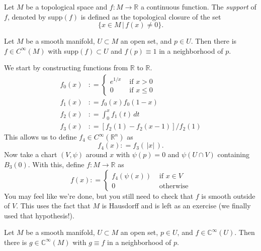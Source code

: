 \documentclass{ximera}
\begin{document}
    \begin{definition}[Support]
        Let $M$ be a topological space and $f : M \to \mathbb{R}$ a continuous function. The \emph{support} of $f$, denoted by supp$(f)$ is defined as the topological closure of the set 
        \[      \{  x \in M  \, \vert \, f(x) \neq 0  \} .   \]
    \end{definition}
    
    \begin{proposition}
        Let $M$ be a smooth manifold, $U \subset M$ an open set, and $p\in U$. Then there is $f \in C^{\infty}(M)$  with supp$(f) \subset U$ and $f(p) \equiv 1$ in a neighborhood of $p$. 

        

    
    \begin{solution}
         We start by constructing functions from $\mathbb{R}$ to $\mathbb{R}$. 
    \begin{align*}
              f_0(x)    & : = \begin{cases}
            e^{1/x}  & \text{ if } x > 0 \\
            0 & \text{ if } x \leq 0
        \end{cases}           \\
     f_1 (x) &: = f_0 (x) f_0 (1-x)  \\
      f _2 (x) &: = \int_ 0 ^x f_1 (t) \, dt      \\
      f_3 (x) & : =   [   f_2 (1)  - f_2 (x - 1 )  ] / f_2 (1)    
    \end{align*}
    This allows us to define $f_4 \in C^{\infty}(\mathbb{R}^n)$ as
    \[    f_4 (x) : = f_3 (\, \vert x \vert  \, ) .                        \]
    Now take a chart $(V, \psi ) $ around $x$ with $\psi (p) = 0$ and $\psi (U \cap V )$  containing $B_3 (0)$. With this,  define $f : M \to \mathbb{R}$ as
    \[ f(x ) : = \begin{cases}
        f_4 (\psi (x) ) & \text{ if } x \in V\\
       0 & \text{ otherwise} 
    \end{cases} \] 
    You may feel like we're done, but you still need to check that $f$ is smooth outside of $V$. This uses the fact that $M$ is Hausdorff and is left as an exercise (we finally used that hypothesis!). 
    \end{solution}
\end{proposition}

    \begin{corollary}
        Let $M$ be a smooth manifold, $U \subset M$ an open set, $p \in U$, and $f \in \mathbb{C}^{\infty}(U)$. Then there is $g \in \mathbb{C}^{\infty}(M)$ with $g \equiv f$ in a neighborhood of $p$. 
    \end{corollary}
\end{document}
